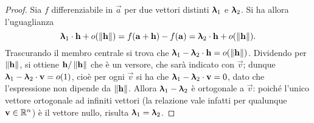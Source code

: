 \begin{proof}
Sia $f$ differenziabile in $\vec a$ per due vettori distinti $\bm{\uplambda}_1$ e $\bm{\uplambda}_2$. Si ha allora l'uguaglianza
\[
{\bm{\uplambda}_1}\cdot{\mathbf{h}}+o(\left\|{\mathbf{h}}\right\|)=f(\mathbf{a}+\mathbf{h})-f(\mathbf{a})={\bm{\uplambda}_2}\cdot{\mathbf{h}}+o(\left\|{\mathbf{h}}\right\|).
\]
Trascurando il membro centrale si trova che ${\bm{\uplambda}_1-\bm{\uplambda}_2}\cdot{\mathbf{h}}=o(\left\|{\mathbf{h}}\right\|)$. Dividendo per $\left\|{\mathbf{h}}\right\|$, si ottiene $\mathbf{h}/\left\|{\mathbf{h}}\right\|$ che è un versore, che sarà indicato con $\vec v$; dunque ${\bm{\uplambda}_1-\bm{\uplambda}_2}\cdot{\mathbf{v}}=o(1)$, cioè per ogni $\vec v$ si ha che ${\bm{\uplambda}_1-\bm{\uplambda}_2}\cdot{\mathbf{v}}=0$, dato che l'espressione non dipende da $\left\|{\mathbf{h}}\right\|$. Allora $\bm{\uplambda}_1-\bm{\uplambda}_2$ è ortogonale a $\vec v$: poiché l'unico vettore ortogonale ad infiniti vettori (la relazione vale infatti per qualunque $\mathbf{v}\in\mathbb{R}^n$) è il vettore nullo, risulta $\bm{\uplambda}_1=\bm{\uplambda}_2$.
\end{proof}

